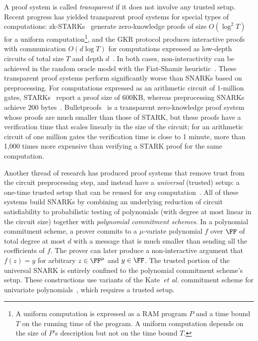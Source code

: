 A proof system is called \emph{transparent} if it does not involve any trusted setup. Recent progress has yielded transparent proof systems for special types of computations: zk-\textsf{STARK}s~\cite{C:BBHR19} generate zero-knowledge proofs of size $O(\log^2 T)$ for a uniform computation\footnote{A uniform computation is expressed as a RAM program $P$ and a time bound $T$ on the running time of the program. A uniform computation depends on the size of $P$'s description but not on the time bound $T$.}, and the GKR protocol produces interactive proofs with communication $O(d \log T)$ for computations expressed as low-depth circuits of total size $T$ and depth $d$~\cite{STOC:GolKalRot08}. In both cases, non-interactivity can be achieved in the random oracle model with the Fiat-Shamir heuristic~\cite{C:FiaSha86,STOC:CCHLRRW19}.
These transparent proof systems perform significantly worse than SNARKs based on preprocessing. For computations expressed as an arithmetic circuit of $1$-million gates, \textsf{STARK}s~\cite{C:BBHR19} report a proof size of $600$KB, whereas preprocessing SNARKs achieve $200$ bytes~\cite{EC:Groth16}. Bulletproofs~\cite{SP:BBBPWM18, EPRINT:BCCGP16} is a transparent zero-knowledge proof system whose proofs are much smaller than those of \textsf{STARK}, but these proofs have a verification time that scales linearly in the size of the circuit; for an arithmetic circuit of one million gates the verification time is close to 1 minute, more than 1,000 times more expensive than verifying a \textsf{STARK} proof for the same computation. 


Another thread of research has produced proof systems that remove trust from the circuit preprocessing step, and instead have a \emph{universal} (trusted) setup: a one-time trusted setup that can be reused for \emph{any} computation~\cite{Sonic,Libra,Plonk}. All of these systems build SNARKs by combining an underlying reduction of circuit satisfiability to probabilistic testing of polynomials (with degree at most linear in the circuit size) together with \emph{polynomial commitment schemes}. In a polynomial commitment scheme, a prover commits to a $\mu$-variate polynomial $f$ over $\FF$ of total degree at most $d$ with a message that is much smaller than sending all the coefficients of $f$. The prover can later produce a non-interactive argument that $f(z) = y$ for arbitrary $z \in \FF^\mu$ and $y \in \FF$. %
The trusted portion of the universal SNARK is entirely confined to the polynomial commitment scheme's setup. These constructions use variants of the Kate~\emph{et al.} commitment scheme for univariate polynomials~\cite{AC:KatZavGol10}, which requires a trusted setup.%

